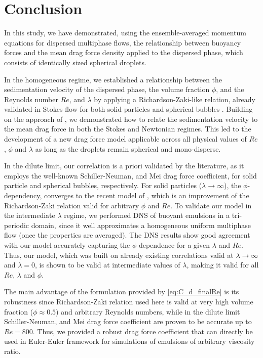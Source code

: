 \section{Conclusion}

In this study, we have demonstrated, using the ensemble-averaged momentum equations for dispersed multiphase flows, the relationship between buoyancy forces and the mean drag force density applied to the dispersed phase, which consists of identically sized spherical droplets. 

In the homogeneous regime, we established a relationship between the sedimentation velocity of the dispersed phase, the volume fraction $\phi$, and the Reynolds number $Re$, and $\lambda$ by applying a Richardson-Zaki-like relation, already validated in Stokes flow for both solid particles and spherical bubbles .
Building on the approach of \citet{jackson2000}, we demonstrated how to relate the sedimentation velocity to the mean drag force in both the Stokes and Newtonian regimes. 
This led to the development of a new drag force model applicable across all physical values of  $Re$, $\phi$ and $\lambda$ as long as the droplets remain spherical and mono-disperse. 

In the dilute limit, our correlation is a priori validated by the literature, as it employs the well-known Schiller-Neuman, and Mei drag force coefficient, for solid particle and spherical bubbles, respectively. 
For solid particles ($\lambda \to \infty$), the $\phi$-dependency, converges to the recent model of \citet{kramer2019improvement}, which is an improvement of the Richardson-Zaki relation valid for arbitrary $\phi$ and $Re$.
To validate our model in the intermediate $\lambda$ regime, we performed DNS of buoyant emulsions in a tri-periodic domain, since it well approximates a homogeneous uniform multiphase flow (once the properties are averaged).
The DNS results show good agreement with our model accurately capturing the $\phi$-dependence for a given $\lambda$ and $Re$.
Thus, our model, which was built on already existing correlations valid at $\lambda\to\infty$ and $\lambda = 0$, is shown to be valid at intermediate values of $\lambda$, making it valid for all $Re$, $\lambda$ and $\phi$.  

The main advantage of the formulation provided by \ref{eq:C_d_finalRe} is its robustness since Richardson-Zaki relation used here is valid at very high volume fraction  ($\phi \approx 0.5$) and arbitrary Reynolds numbers, while in the dilute limit Schiller-Neuman, and Mei drag force coefficient are proven to be accurate up to $Re = 800$. 
Thus, we provided a robust drag force coefficient that can directly be used in Euler-Euler framework for simulations of emulsions of arbitrary viscosity ratio. 